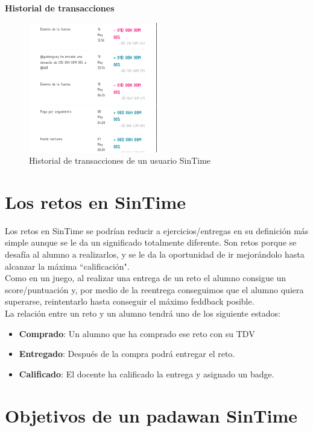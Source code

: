 \textbf{Historial de transacciones}
\begin{figure}[ht]
	\centering
	\includegraphics[width=0.5\textwidth]{imagenes/secciones/introduccion/historial.png}
	\caption{Historial de transacciones de un usuario SinTime}
	\label{historial}
\end{figure}

\section{Los retos en SinTime}
Los retos en SinTime se podrían reducir a ejercicios/entregas en su definición más simple aunque se le da un significado totalmente diferente. Son retos porque se desafía al alumno a realizarlos, y se le da la oportunidad de ir mejorándolo hasta alcanzar la máxima ``calificación".\\

Como en un juego, al realizar una entrega de un reto el alumno consigue un score/puntuación y, por medio de la reentrega conseguimos que el alumno quiera superarse, reintentarlo hasta conseguir el máximo feddback posible. \\


La relación entre un reto y un alumno tendrá uno de los siguiente estados:

\begin{itemize}
	\item \textbf{Comprado}: Un alumno que ha comprado ese reto con su TDV
	\item \textbf{Entregado}: Después de la compra podrá entregar el reto.
	\item \textbf{Calificado}: El docente ha calificado la entrega y asignado un badge.
\end{itemize}

\section{Objetivos de un padawan SinTime}

